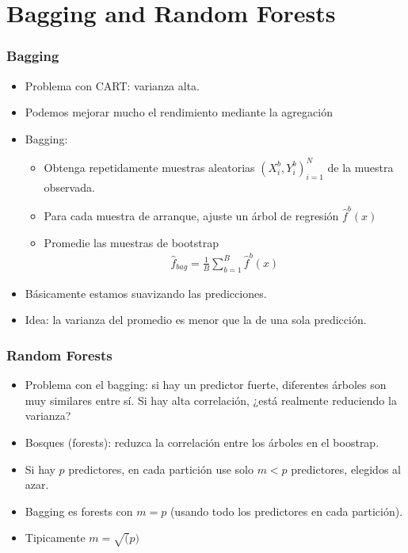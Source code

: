 \documentclass[
  shownotes,
  xcolor={svgnames},
  hyperref={colorlinks,citecolor=DarkBlue,linkcolor=DarkRed,urlcolor=DarkBlue}
  , aspectratio=169]{beamer}
\begin{document}
\section{Bagging and Random Forests }
\begin{frame}[fragile]
\frametitle{Bagging}

\begin{itemize}
  \item Problema con CART: varianza alta.
  \medskip
   \item Podemos mejorar mucho el rendimiento mediante la agregación 
   \medskip
   \item Bagging:
    \begin{itemize}
       \item Obtenga repetidamente muestras aleatorias $(X_i^b,Y_i^b)_{i=1}^N$ de la muestra observada.
       \medskip
       \item Para cada muestra de arranque, ajuste un árbol de regresión $\hat{f}^b(x)$
       \medskip
       \item Promedie las muestras de bootstrap 
        \begin{align}
         \hat{f}_{bag} =\frac{1}{B}\sum_{b=1}^B \hat{f}^b(x)
        \end{align}
      \end{itemize}
  \item Básicamente estamos suavizando las predicciones.
  \medskip
  \item Idea: la varianza del promedio es menor que la de una sola predicción.
  \end{itemize}

\end{frame}

\begin{frame}[fragile]
\frametitle{Random Forests}

\begin{itemize}
  \item Problema con el bagging: si hay un predictor fuerte, diferentes árboles son muy similares entre sí. Si hay alta correlación, ¿está realmente reduciendo la varianza?
\bigskip
\item Bosques (forests): reduzca la correlación entre los árboles  en el boostrap.
\bigskip
\item Si hay $p$ predictores, en cada partición use solo  $m <p$ predictores, elegidos al azar.
\bigskip
\item Bagging es forests con $m = p$ (usando todo los predictores en cada partición).
\bigskip
\item Tipicamente $m = \sqrt(p)$
\end{itemize}

\end{frame}
\end{document}

